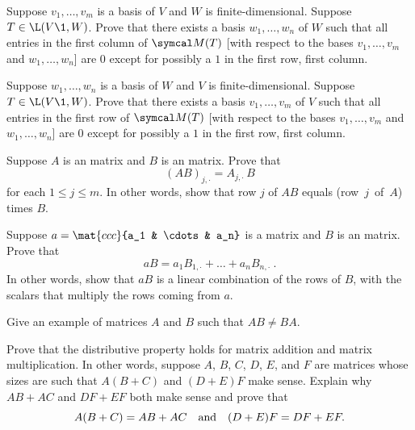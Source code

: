 \begin{exercises}
\exercise
Suppose $v_1, \dots, v_m$ is a basis of $V$ and $W$ is finite-dimensional. Suppose $T \in \L(V\1, W)$. Prove that there exists a basis $w_1, \dots, w_n$ of $W$ such that all entries in the first column of $\M(T)$ [with respect to the bases $v_1, \dots, v_m$ and $w_1, \dots, w_n$] are $0$ except for possibly a $1$ in the first row, first column.


\exercise
Suppose $w_1, \dots, w_n$ is a basis of $W$ and $V$ is finite-dimensional. Suppose $T \in \L(V\1, W)$. Prove that there exists a basis $v_1, \dots, v_m$ of $V$ such that all entries in the first row of $\M(T)$ [with respect to the bases $v_1, \dots, v_m$ and $w_1, \dots, w_n$] are $0$ except for possibly a $1$ in the first row, first column.


\exercise
Suppose $A$ is an  matrix and $B$ is an  matrix. Prove that \label{3think1}
\[
(AB)_{j,\cdot} = A_{j,\cdot} \, B
\]
for each $1 \le j \le m$. In other words, show that row $j$ of $AB$ equals (row~$j$~of~$A$) times $B$.


\exercise
Suppose $a = \mat{ccc}{a_1 & \cdots & a_n}$ is a  matrix and $B$ is an  matrix. Prove that \label{3think2}
\[
aB = a_1 B_{1, \cdot} + \dots + a_n B_{n, \cdot}\ .
\]
In other words, show that $aB$ is a linear combination of the rows of $B$, with the scalars that multiply the rows coming from $a$.



\exercise
Give an example of  matrices $A$ and $B$ such that $AB \ne BA$. \label{noncommute}


\exercise
Prove that the distributive property holds for matrix addition and matrix
multiplication.  In other words, suppose $A$, $B$, $C$, $D$, $E$, and $F$ are matrices whose
sizes are such that $A(B+C)$ and $(D+E)F$ make sense.  Explain why $AB + AC$ and $DF + EF$ both make sense
and prove that\label{3distrib}
\[
A(B+C) = AB + AC \quad \text{and} \quad (D+E)F = DF + EF.
\]
\exercisedisplayend



\end{exercises}

